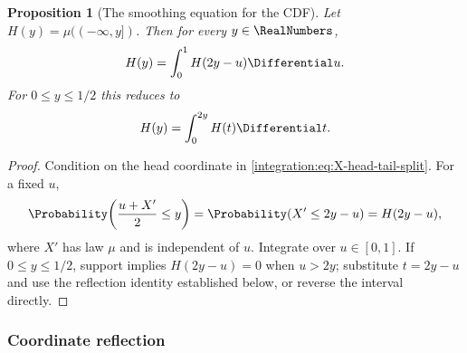 \documentclass[11pt,oneside]{article}
\newtheorem{proposition}[proposition]{Proposition}
\theoremstyle{definition}
\theoremstyle{remark}
\begin{document}
\begin{proposition}[The smoothing equation for the CDF]
\label{integration:prop:CDF-smoothing-detailed}
Let $H(y)=\mu(({-\infty},y])$.  Then for every $y\in\RealNumbers$,
\begin{equation}
 H(y)=\int_0^1 H(2y-u)\Differential u.
 \label{integration:eq:CDF-smoothing-detailed}
\end{equation}
For $0\le y\le1/2$ this reduces to
\begin{equation}
 H(y)=\int_0^{2y}H(t)\Differential t.
 \label{integration:eq:CDF-left-detailed}
\end{equation}
\end{proposition}

\begin{proof}
Condition on the head coordinate in \eqref{integration:eq:X-head-tail-split}.  For a fixed $u$,
\[
 \Probability\!\left(\frac{u+X'}2\le y\right)=\Probability(X'\le2y-u)=H(2y-u),
\]
where $X'$ has law $\mu$ and is independent of $u$.  Integrate over $u\in[0,1]$.  If
$0\le y\le1/2$, support implies $H(2y-u)=0$ when $u>2y$; substitute $t=2y-u$ and use the
reflection identity established below, or reverse the interval directly.
\end{proof}

\subsubsection{Coordinate reflection}
\end{document}
